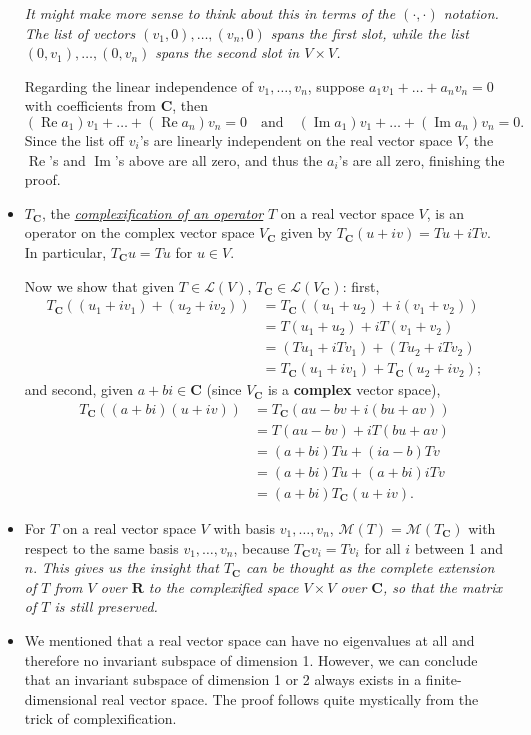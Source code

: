 \documentclass[11pt]{article}
\newcommand{\df}[1]{\ul{\textit{\textsf{#1}}}}
\newcommand{\R}{\mathbf{R}}
\newcommand{\C}{\mathbf{C}}
\renewcommand{\Re}{\operatorname{Re}}
\renewcommand{\Im}{\operatorname{Im}}
\newcommand{\LV}{\mathcal{L}(V)}
\newcommand{\M}{\mathcal{M}}
\begin{document}
\begin{itemize}
    \emph{It might make more sense to think about this in terms of the $(\cdot,\cdot)$ notation. The list of vectors $(v_1,0),\dots,(v_n,0)$ spans the first slot, while the list $(0,v_1),\dots,(0,v_n)$ spans the second slot in $V \times V$.}

    Regarding the linear independence of $v_1,\dots,v_n$, suppose $a_1v_1+\dots+a_nv_n = 0$ with coefficients from $\C$, then 
    \[(\Re a_1)v_1+ \dots + (\Re a_n)v_n = 0 \quad \text{and} \quad (\Im a_1)v_1 + \dots + (\Im a_n)v_n = 0.\]
    Since the list off $v_i$'s are linearly independent on the real vector space $V$, the $\Re$'s and $\Im$'s above are all zero, and thus the $a_i$'s are all zero, finishing the proof.
    \item $T_\C$, the \df{complexification of an operator} $T$ on a real vector space $V$, is an operator on the complex vector space $V_\C$ given by $T_\C (u+iv) = Tu + i Tv$. In particular, $T_\C u = Tu$ for $u \in V$.

    Now we show that given $T \in \LV$, $T_\C \in \mathcal{L}(V_\C)$: first, \begin{align*}
        T_\C((u_1+iv_1)+(u_2+iv_2)) & = T_\C((u_1+u_2)+i(v_1+v_2)) \\ & = T(u_1+u_2) + iT(v_1+v_2) \\ & = (Tu_1 + iTv_1) + (Tu_2 + iTv_2) \\ & = T_\C(u_1 + iv_1) + T_\C(u_2 + iv_2);
    \end{align*}
    and second, given $a+bi \in \C$ (since $V_\C$ is a \textbf{complex} vector space),
    \begin{align*}
        T_\C((a+bi)(u+iv)) & = T_\C(au-bv + i(bu+av)) \\ & = T(au-bv) + iT(bu+av) \\ & = (a+bi)Tu+(ia-b)Tv \\ & = (a+bi)Tu + (a+bi)iTv \\ & = (a+bi) T_\C(u+iv).
    \end{align*}
    \item For $T$ on a real vector space $V$ with basis $v_1,\dots,v_n$, $\M(T) = \M(T_\C)$ with respect to the same basis $v_1,\dots,v_n$, because $T_\C v_i = Tv_i$ for all $i$ between 1 and $n$. \emph{This gives us the insight that $T_\C$ can be thought as the complete extension of $T$ from $V$ over $\R$ to the complexified space $V \times V$ over $\C$, so that the matrix of $T$ is still preserved.}
    \item We mentioned that a real vector space can have no eigenvalues at all and therefore no invariant subspace of dimension 1. However, we can conclude that an invariant subspace of dimension 1 or 2 always exists in a finite-dimensional real vector space. The proof follows quite mystically from the trick of complexification.


\end{itemize}
\end{document}

